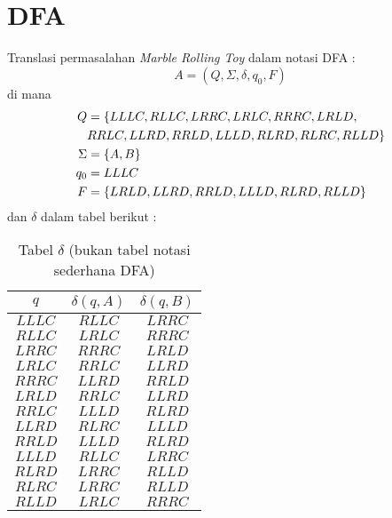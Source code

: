 \section{DFA}
\label{sec:DFA}
Translasi permasalahan \textit{Marble Rolling Toy} dalam notasi DFA :
\begin{equation*}
  A = (Q, \Sigma, \delta, q_0, F)
\end{equation*}
di mana
\begin{align*}
  \centering
  Q &= \{LLLC, RLLC, LRRC, LRLC, RRRC, LRLD, \\&RRLC, LLRD, RRLD, LLLD, RLRD, RLRC, RLLD\} \\
  \Sigma &= \{A, B\} \\
  q_0 &= LLLC \\
  F &= \{LRLD, LLRD, RRLD, LLLD, RLRD, RLLD\} \\
\end{align*}
dan $\delta$ dalam tabel berikut :
\begin{table}[h!]
  \centering
  \caption{Tabel $\delta$ (bukan tabel notasi sederhana DFA)}
  \begin{tabular}{c||c|c}
     $q$ & $\delta(q,A)$ & $\delta(q,B)$ \\
     \hline \hline
     $LLLC$ & $RLLC$ & $LRRC$ \\
     $RLLC$ & $LRLC$ & $RRRC$ \\
     $LRRC$ & $RRRC$ & $LRLD$ \\
     $LRLC$ & $RRLC$ & $LLRD$ \\
     $RRRC$ & $LLRD$ & $RRLD$ \\
     $LRLD$ & $RRLC$ & $LLRD$ \\
     $RRLC$ & $LLLD$ & $RLRD$ \\
     $LLRD$ & $RLRC$ & $LLLD$ \\
     $RRLD$ & $LLLD$ & $RLRD$ \\
     $LLLD$ & $RLLC$ & $LRRC$ \\
     $RLRD$ & $LRRC$ & $RLLD$ \\
     $RLRC$ & $LRRC$ & $RLLD$ \\
     $RLLD$ & $LRLC$ & $RRRC$ \\
  \end{tabular}
\end{table}
